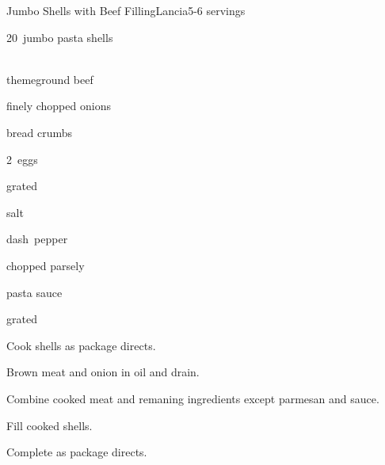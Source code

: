 \begin{recipe}{Jumbo Shells with Beef Filling}{Lancia}{5-6 servings}

\begin{ingredients}
\item 20~jumbo pasta shells
\item {} \\theme{ground beef}
\item \C{\quarter} finely chopped onions
\item \C{\quarter} bread crumbs
\item 2~eggs
\item {} grated 
\item \tp{\half} salt
\item dash~pepper
\item {} chopped parsely
\item \C{3\half} pasta sauce
\item \C{\quarter} grated 
\end{ingredients}

\begin{directions}
\item Cook shells as package directs.
\item Brown meat and onion in oil and drain.
\item Combine cooked meat and remaning ingredients except parmesan and sauce.
\item Fill cooked shells.
\item Complete as package directs.
\end{directions}

\end{recipe}
